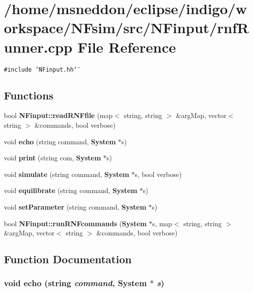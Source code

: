 \section{/home/msneddon/eclipse/indigo/workspace/NFsim/src/NFinput/rnfRunner.cpp File Reference}
\label{rnfRunner_8cpp}


{\tt \#include \char`\"{}NFinput.hh\char`\"{}}\par
\subsection*{Functions}
\begin{CompactItemize}
\item 
bool {\bf NFinput::readRNFfile} (map$<$ string, string $>$ \&argMap, vector$<$ string $>$ \&commands, bool verbose)
\item 
void {\bf echo} (string command, {\bf System} $\ast$s)
\item 
void {\bf print} (string com, {\bf System} $\ast$s)
\item 
void {\bf simulate} (string command, {\bf System} $\ast$s, bool verbose)
\item 
void {\bf equilibrate} (string command, {\bf System} $\ast$s)
\item 
void {\bf setParameter} (string command, {\bf System} $\ast$s)
\item 
bool {\bf NFinput::runRNFcommands} ({\bf System} $\ast$s, map$<$ string, string $>$ \&argMap, vector$<$ string $>$ \&commands, bool verbose)
\end{CompactItemize}


\subsection{Function Documentation}
\subsubsection{\setlength{\rightskip}{0pt plus 5cm}void echo (string {\em command}, {\bf System} $\ast$ {\em s})}\label{rnfRunner_8cpp_b9195e4e490de9bb49a6087159f657f7}


